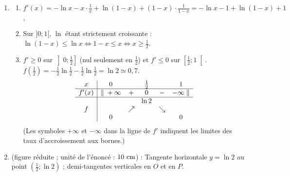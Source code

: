 \begin{enumerate}
      La courbe admet aux points $O(0 ; 0)$ et $P(1 ; 0)$ des \emph{demi-tangentes verticales} (port\'ees par les droites $x = 0$ et $x = 1$).
   \item
      \begin{enumerate}
         \item {}
            $f'(x) = -\ln x - x\cdot\frac{1}{x} + \ln(1 - x) + (1 - x)\cdot\frac{1}{1 - x} = -\ln x - 1 + \ln(1 - x) + 1$,
            \par\noindent{}
         \item {}
            Sur $]0 ; 1[$, $\ln$ \'etant strictement croissante : $\ln(1 - x) \leq \ln x \iff 1 - x \leq x \iff x \geq \frac{1}{2}$.
            \par\noindent\ansbox{$S = \left[\frac{1}{2} ; 1\right[$.}
         \item {}
            $f' \geq 0$ sur $\left]0 ; \frac{1}{2}\right]$ (nul seulement en $\frac{1}{2}$) et $f' \leq 0$ sur $\left[\frac{1}{2} ; 1\right[$.
            $f\left(\frac{1}{2}\right) = -\frac{1}{2}\ln\frac{1}{2} - \frac{1}{2}\ln\frac{1}{2} = \ln 2 \simeq 0{,}7$.
            \[
               \begin{array}{c|ccccc}
                  x & 0 & & \frac{1}{2} & & 1 \\ \hline
                  f'(x) & \| \; +\infty & + & 0 & - & -\infty \; \| \\ \hline
                  & & & \ln 2 & & \\
                  f & & \nearrow & & \searrow & \\
                  & 0 & & & & 0
               \end{array}
            \]
            (Les symboles $+\infty$ et $-\infty$ dans la ligne de $f'$ indiquent les limites des taux d'accroissement aux bornes.)
      \end{enumerate}
   \item {} (figure r\'eduite ; unit\'e de l'\'enonc\'e : $10~\mathrm{cm}$) :
      Tangente horizontale $y = \ln 2$ au point $\left(\frac{1}{2} ; \ln 2\right)$ ; demi-tangentes verticales en $O$ et en $P$.
      \begin{center}
\end{center}
\end{enumerate}

